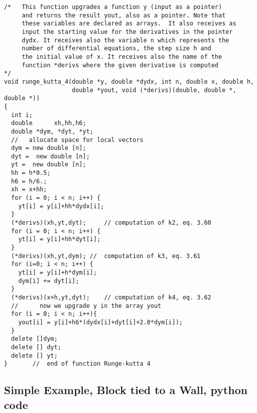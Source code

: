 \documentclass[%
oneside,                 %
final,                   %
10pt]{article}
\begin{document}
\begin{verbatim}
/*   This function upgrades a function y (input as a pointer)
     and returns the result yout, also as a pointer. Note that
     these variables are declared as arrays.  It also receives as
     input the starting value for the derivatives in the pointer
     dydx. It receives also the variable n which represents the 
     number of differential equations, the step size h and 
     the initial value of x. It receives also the name of the
     function *derivs where the given derivative is computed
*/
void runge_kutta_4(double *y, double *dydx, int n, double x, double h, 
                   double *yout, void (*derivs)(double, double *, double *))
{
  int i;
  double      xh,hh,h6; 
  double *dym, *dyt, *yt;
  //   allocate space for local vectors   
  dym = new double [n];
  dyt =  new double [n];
  yt =  new double [n];
  hh = h*0.5;
  h6 = h/6.;
  xh = x+hh;
  for (i = 0; i < n; i++) {
    yt[i] = y[i]+hh*dydx[i];
  }
  (*derivs)(xh,yt,dyt);     // computation of k2, eq. 3.60   
  for (i = 0; i < n; i++) {
    yt[i] = y[i]+hh*dyt[i];
  }
  (*derivs)(xh,yt,dym); //  computation of k3, eq. 3.61   
  for (i=0; i < n; i++) {
    yt[i] = y[i]+h*dym[i];
    dym[i] += dyt[i];
  }
  (*derivs)(x+h,yt,dyt);    // computation of k4, eq. 3.62   
  //      now we upgrade y in the array yout  
  for (i = 0; i < n; i++){
    yout[i] = y[i]+h6*(dydx[i]+dyt[i]+2.0*dym[i]);
  }
  delete []dym;
  delete [] dyt;
  delete [] yt;
}       //  end of function Runge-kutta 4  
\end{verbatim}



\subsection*{Simple Example, Block tied to a Wall, python code}

\end{document}
